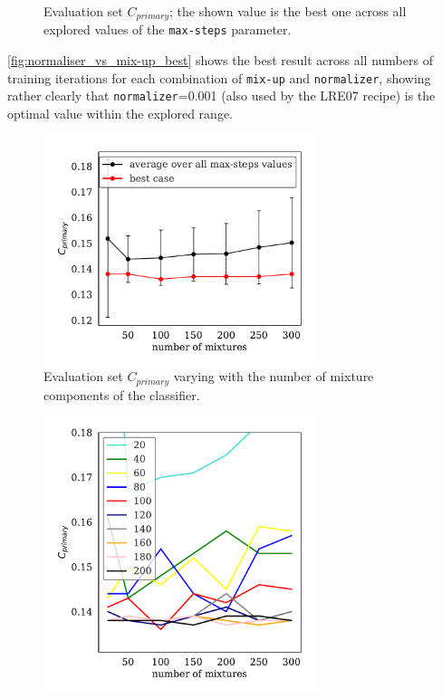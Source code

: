 \documentclass[bsc,frontabs,twoside,singlespacing,parskip,deptreport]{infthesis}
\begin{document}
{{\begin{figure}[h!]
      \vspace*{-1em}
      \caption{Evaluation set $C_{primary}$; the shown value is the best one across all explored values of the \texttt{max-steps} parameter.}
      \label{fig:normaliser_vs_mix-up_best}
    \end{figure}
    \autoref{fig:normaliser_vs_mix-up_best} shows the best result across all numbers of training iterations for each combination of \verb|mix-up| and \verb|normalizer|, showing rather clearly that \verb|normalizer|=0.001 (also used by the LRE07 recipe) is the optimal value within the explored range.
    \begin{figure}[h!]
      \centering
      \includegraphics[width=8cm]{../img/logit_mix-up.pdf}
      \vspace*{-1em}
      \caption{Evaluation set $C_{primary}$ varying with the number of mixture components of the classifier.}
      \label{fig:logit_mix-up}
    \end{figure}
    \begin{figure}[h!]
      \centering
      \includegraphics[width=8cm]{../img/logit_max-steps_vs_mix-up.pdf}
      \vspace*{-1em}

\end{figure}}}
\end{document}
